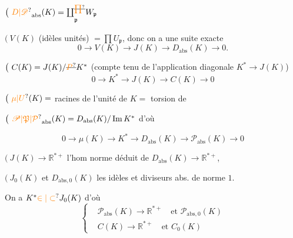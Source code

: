 $\bigl(\ {\unsure{D|\mathscr{D}}}_{\mathrm{abs}}(K)=\underset{\mathfrak p}{\coprod^{\deleted{\unsure{\prod}}}}W_{\mathfrak p}$

$\bigl(\ V(K)$ (idèles unités) $=\prod U_{\mathfrak p}$, donc on a une suite exacte
\[
0\longrightarrow V(K)\longrightarrow J(K)\longrightarrow D_{\mathrm{abs}}(K)\longrightarrow0.
\]


$\bigl(\ C(K)=J(K)/\deleted{\unsure{P}}K^*$ (compte tenu de l'application diagonale $K^*\longrightarrow J(K)$)
\[
0\longrightarrow K^*\longrightarrow J(K)\longrightarrow C(K)\longrightarrow0
\]

$\bigl(\ \unsure{\mu|U}(K)=$ racines de l'unité de $K=$ torsion de


$\bigl(\ {\unsure{\mathscr{P}|\mathfrak{P}|\mathcal{P}}}_{\mathrm{abs}}(K)=D_{\mathrm{abs}}(K)/\operatorname{Im}K^*$ d'où

\[
0\longrightarrow\mu(K)\longrightarrow K^*\longrightarrow D_{\mathrm{abs}}(K)\longrightarrow\mathscr{P}_{\mathrm{abs}}(K)\longrightarrow0
\]

$\bigl(\ J(K)\longrightarrow\mathbb R^{*+}$ l'hom norme déduit de $D_{\mathrm{abs}}(K)\longrightarrow\mathbb R^{*+}$,

$\bigl(\ J_0(K)$ et $D_{\mathrm{abs},0}(K)$ les idèles et diviseurs abs. de norme $1$.

On a $K^*\unsure{\in|\subset}J_0(K)$ d'où
\[
\left\{\begin{aligned}
&\mathscr{P}_{\mathrm{abs}}(K)\longrightarrow\mathbb R^{*+}\quad\text{et }\mathscr{P}_{\mathrm{abs},0}(K)\\
&C(K)\longrightarrow\mathbb R^{*+}\quad\text{et }C_0(K)
\end{aligned}\right.
\]



